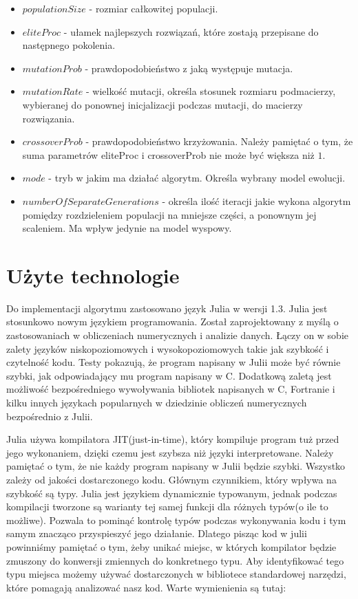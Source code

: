 \begin{itemize}
    \item $populationSize$ - rozmiar całkowitej populacji.
    \item $eliteProc$ - ułamek najlepszych rozwiązań, które zostają przepisane do następnego pokolenia.
    \item $mutationProb$ - prawdopodobieństwo z jaką występuje mutacja.
    \item $mutationRate$ - wielkość mutacji, określa stosunek rozmiaru podmacierzy, wybieranej do ponownej inicjalizacji podczas mutacji, 
    do macierzy rozwiązania.
    \item $crossoverProb$ - prawdopodobieństwo krzyżowania. Należy pamiętać o tym, że suma parametrów eliteProc i crossoverProb nie 
    może być większa niż $1$.
    \item $mode$ - tryb w jakim ma działać algorytm. Określa wybrany model ewolucji.
    \item $numberOfSeparateGenerations$ - określa ilość iteracji jakie wykona algorytm pomiędzy rozdzieleniem populacji na 
    mniejsze części, a ponownym jej scaleniem. Ma wpływ jedynie na model wyspowy. 
\end{itemize}

\section{Użyte technologie}
Do implementacji algorytmu zastosowano język Julia\cite{JULIA-PUB} w wersji 1.3. Julia jest stosunkowo nowym językiem programowania. Został zaprojektowany 
z myślą o zastosowaniach w obliczeniach numerycznych i analizie danych. Łączy on w sobie zalety języków niskopoziomowych i wysokopoziomowych takie jak szybkość 
i czytelność kodu. Testy pokazują, że program napisany w Julii może być równie szybki, jak odpowiadający mu program napisany w C\cite{JULIA-PERFORMANCE}. 
Dodatkową zaletą jest możliwość bezpośredniego wywoływania bibliotek napisanych w C, Fortranie i kilku innych językach popularnych w dziedzinie 
obliczeń numerycznych bezpośrednio z Julii.

Julia używa kompilatora JIT(just-in-time), który kompiluje program tuż przed jego wykonaniem, dzięki czemu jest szybsza 
niż języki interpretowane. Należy pamiętać o tym, że nie każdy program napisany w Julii będzie szybki. Wszystko zależy od jakości dostarczonego kodu.
Głównym czynnikiem, który wpływa na szybkość są typy. Julia jest językiem dynamicznie typowanym, jednak podczas kompilacji tworzone są warianty tej samej 
funkcji dla różnych typów(o ile to możliwe). Pozwala to pominąć kontrolę typów podczas wykonywania kodu i tym samym znacząco przyspieszyć jego działanie.
Dlatego pisząc kod w julii powinniśmy pamiętać o tym, żeby unikać miejsc, w których kompilator będzie zmuszony do konwersji zmiennych do konkretnego typu. 
Aby identyfikować tego typu miejsca możemy używać dostarczonych w bibliotece standardowej narzędzi, które pomagają analizować nasz kod. 
Warte wymienienia są tutaj:

